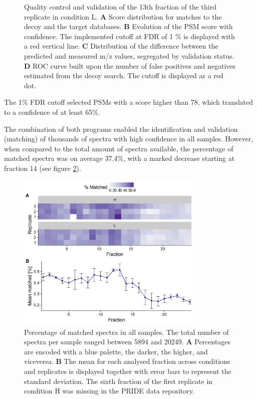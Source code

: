 \documentclass[11pt, a4paper]{report}
\begin{document}
\begin{figure}[!h]
\begin{subfigure}{.45\textwidth}
\end{subfigure}
\caption{Quality control and validation of the 13th fraction of the third replicate in condition L. \textbf{A} Score distribution for matches to the decoy and the target databases. \textbf{B} Evolution of the PSM score with confidence. The implemented cutoff at FDR of 1 \% is displayed with a red vertical line. \textbf{C} Distribution of the difference between the predicted and measured \ac{m/z} values, segregated by validation status. \textbf{D} ROC curve built upon the number of false positives and negatives estimated from the decoy search. The cutoff is displayed as a red dot.}
\label{figure:qc_validation}
\end{figure}

 The 1\% FDR cutoff selected PSMs with a score higher than 78, which translated to a confidence of at least 65\%.


The combination of both programs enabled the identification and validation (matching) of thousands of spectra with high confidence in all samples. However, when compared to the total amount of spectra available, the percentage of matched spectra was on average 37.4\%, with a marked decrease starting at fraction 14 (see figure \ref{fig:match_percent}).

\begin{figure}[!h]
\includegraphics[width=0.8\textwidth]{match_percent}
\caption{Percentage of matched spectra in all samples. The total number of spectra per sample ranged between 5894 and 20249. \textbf{A} Percentages are encoded with a blue palette, the darker, the higher, and viceversa. \textbf{B} The mean for each analysed fraction across conditions and replicates is displayed together with error bars to represent the standard deviation. The sixth fraction of the first replicate in condition H was missing in the PRIDE data repository.}
\label{fig:match_percent}
\end{figure}
\end{document}
